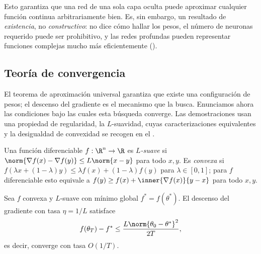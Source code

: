 Esto garantiza que una red de una sola capa oculta puede aproximar cualquier
funci\'on continua arbitrariamente bien. Es, sin embargo, un resultado de
\emph{existencia}, no \emph{constructivo}: no dice c\'omo hallar los pesos, el
n\'umero de neuronas requerido puede ser prohibitivo, y las redes profundas pueden
representar funciones complejas mucho m\'as eficientemente ().

\subsection{Teor\'ia de convergencia}
\label{sec:found:convergence}

El teorema de aproximaci\'on universal garantiza que existe una configuraci\'on de
pesos; el descenso del gradiente es el mecanismo que la busca. Enunciamos ahora las
condiciones bajo las cuales esta b\'usqueda converge. Las demostraciones usan una
propiedad de regularidad, la $L$-suavidad, cuyas caracterizaciones equivalentes y
la desigualdad de convexidad se recogen en el .

\begin{definition}
\label{def:found:smooth}
Una funci\'on diferenciable $f : \R^n \to \R$ es \emph{$L$-suave} si
$\norm{\nabla f(x) - \nabla f(y)} \le L\norm{x - y}$ para todo $x, y$. Es
\emph{convexa} si $f(\lambda x + (1-\lambda)y) \le \lambda f(x) + (1-\lambda)f(y)$
para $\lambda \in [0,1]$; para $f$ diferenciable esto equivale a
$f(y) \ge f(x) + \inner{\nabla f(x)}{y - x}$ para todo $x, y$.
\end{definition}

\begin{theorem}
\label{thm:found:gd-convex}
Sea $f$ convexa y $L$-suave con m\'inimo global $f^* = f(\theta^*)$. El descenso
del gradiente con tasa $\eta = 1/L$ satisface
\[
  f(\theta_T) - f^* \le \frac{L\norm{\theta_0 - \theta^*}^2}{2T},
\]
es decir, converge con tasa $O(1/T)$.
\end{theorem}

